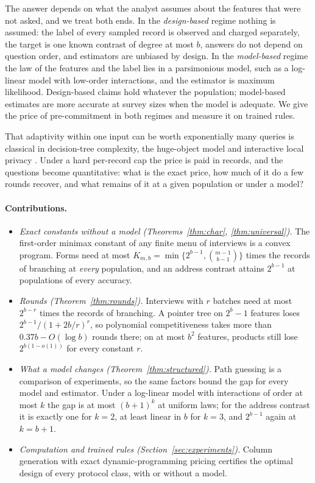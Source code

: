 \documentclass{article}
\begin{document}
The answer depends on what the analyst assumes about the features that were not asked, and we treat both ends. In the \emph{design-based} regime nothing is assumed: the label of every sampled record is observed and charged separately, the target is one known contrast of degree at most $b$, answers do not depend on question order, and estimators are unbiased by design. In the \emph{model-based} regime the law of the features and the label lies in a parsimonious model, such as a log-linear model with low-order interactions, and the estimator is maximum likelihood. Design-based claims hold whatever the population; model-based estimates are more accurate at survey sizes when the model is adequate. We give the price of pre-commitment in both regimes and measure it on trained rules.

That adaptivity within one input can be worth exponentially many queries is classical in decision-tree complexity, the huge-object model and interactive local privacy \citep{goldreich2022,adar2024,joseph2019,joseph2020}. Under a hard per-record cap the price is paid in records, and the questions become quantitative: what is the exact price, how much of it do a few rounds recover, and what remains of it at a given population or under a model?

\paragraph{Contributions.}
\begin{itemize}\itemsep1pt\parskip0pt
\item \emph{Exact constants without a model (Theorems~\ref{thm:char}, \ref{thm:universal}).} The first-order minimax constant of any finite menu of interviews is a convex program. Forms need at most $K_{m,b}=\min\{2^{b-1},\binom{m-1}{b-1}\}$ times the records of branching at \emph{every} population, and an address contrast attains $2^{b-1}$ at populations of every accuracy.
\item \emph{Rounds (Theorem~\ref{thm:rounds}).} Interviews with $r$ batches need at most $2^{b-r}$ times the records of branching. A pointer tree on $2^b-1$ features loses $2^{b-1}/(1+2b/r)^r$, so polynomial competitiveness takes more than $0.37b-O(\log b)$ rounds there; on at most $b^2$ features, products still lose $2^{b(1-o(1))}$ for every constant $r$.
\item \emph{What a model changes (Theorem~\ref{thm:structured}).} Path guessing is a comparison of experiments, so the same factors bound the gap for every model and estimator. Under a log-linear model with interactions of order at most $k$ the gap is at most $(b+1)^k$ at uniform laws; for the address contrast it is exactly one for $k=2$, at least linear in $b$ for $k=3$, and $2^{b-1}$ again at $k=b+1$.
\item \emph{Computation and trained rules (Section~\ref{sec:experiments}).} Column generation with exact dynamic-programming pricing certifies the optimal design of every protocol class, with or without a model. \nContribData
\end{itemize}
\end{document}
